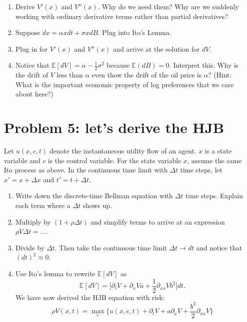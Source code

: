 \documentclass[11pt]{extarticle}
\theoremstyle{plain}
\theoremstyle{definition}
\begin{document}
\begin{enumerate}
\item Derive $V'(x)$ and $V''(x)$. Why do we need them? Why are we suddenly working with ordinary derivative terms rather than partial derivatives? 

\item Suppose $dx = \alpha x dt + \sigma x dB$. Plug into Ito's Lemma.

\item Plug in for $V'(x)$ and $V''(x)$ and arrive at the solution for $dV$. 

\item Notice that $\mathbb E[ dV ] = \alpha - \frac{1}{2} \sigma^2$ because $\mathbb E (dB) = 0$. Interpret this. Why is the drift of $V$ less than $\alpha$ even thow the drift of the oil price is $\alpha$? (Hint: What is the important economic property of log preferences that we care about here?)

\end{enumerate}





\vspace{10mm}
\section*{Problem 5: let's derive the HJB}

Let $u(x, c, t)$ denote the instantaneous utility flow of an agent. $x$ is a state variable and $c$ is the control variable. For the state variable $x$, assume the same Ito process as above. In the continuous time limit with $\Delta t$ time steps, let $x' = x + \Delta x$ and $t' = t + \Delta t$.

\begin{enumerate}
\item Write down the discrete-time Bellman equation with $\Delta t$ time steps. Explain each term where a $\Delta t$ shows up. 

\item Multiply by $(1 + \rho \Delta t)$ and simplify terms to arrive at an expression $\rho V \Delta t = \ldots$. 

\item Divide by $\Delta t$. Then take the continuous time limit $\Delta t \to dt$ and notice that $(dt)^2 \approx 0$. 

\item Use Ito's lemma to rewrite $\mathbb E[dV]$ as 
\begin{equation*}
	\mathbb E[dV] = \bigg[ \partial_t V + \partial_x V a + \frac{1}{2} \partial_{xx} V b^2 \bigg] dt.
\end{equation*}
We have now derived the HJB equation with risk:
\begin{equation*}
		\rho V(x, t) = \max_c \bigg\{ u(x, c, t) + \partial_t V + a \partial_x V + \frac{b^2}{2} \partial_{xx} V \bigg\}
\end{equation*}

\end{enumerate}
\end{document}
